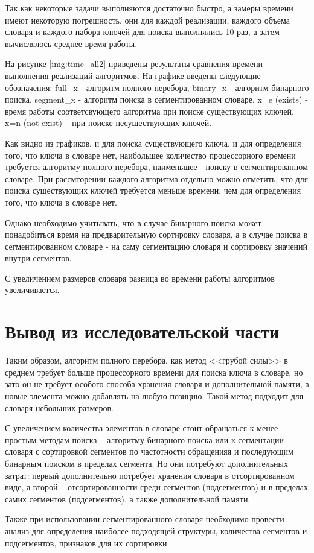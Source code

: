 Так как некоторые задачи выполняются достаточно быстро, а замеры времени имеют некоторую погрешность, они для каждой реализации, каждого объема словаря и каждого набора ключей для поиска выполнялись 10 раз, а затем вычислялось среднее время работы.
 

На рисунке \ref{img:time_all2} приведены результаты сравнения времени выполнения реализаций алгоритмов. На графике введены следующие обозначения: full\_x - алгоритм полного перебора, binary\_x - алгоритм бинарного поиска, segment\_x - алгоритм поиска в сегментированном словаре, x=e (exists) - время работы соответсвующего алгоритма при поиске существующих ключей, x=n (not exist) -- при поиске несуществующих ключей.

\clearpage
{}

Как видно из графиков, и для поиска существующего ключа, и для определения того, что ключа в словаре нет, наибольшее количество процессорного времени требуется алгоритму полного перебора, наименьшее - поиску в сегментированном словаре. При рассмторении каждого алгоритма отдельно можно отметить, что для поиска существующих ключей требуется меньше времени, чем для определения того, что ключа в словаре нет.

Однако необходимо учитывать, что в случае бинарного поиска может понадобиться время на предварительную сортировку словаря, а в случае поиска в сегментированном словаре - на саму сегментацию словаря и сортировку значений внутри сегментов.

С увеличением размеров словаря разница во времени работы алгоритмов увеличивается.






\clearpage
\section{Вывод из исследовательской части}

Таким образом, алгоритм полного перебора, как метод <<грубой силы>> в среднем требует больше процессорного времени для поиска ключа в словаре, но зато он не требует особого способа хранения словаря и дополнительной памяти, а новые элемента можно добавлять на любую позицию. Такой метод подходит для словаря небольших размеров.

С увеличением количества элементов в словаре стоит обращаться к менее простым методам поиска -- алгоритму бинарного поиска или к сегментации словаря с сортировкой сегментов по частотности обращенияя и последующим бинарным поиском в пределах сегмента. Но они потребуют дополнительных затрат: первый дополнительно потребует  хранения словаря в отсортированном виде, а второй -- отсортированности среди сегментов (подсегментов) и в пределах самих сегментов (подсегментов), а также дополнительной памяти.

Также при использовании сегментированного словаря необходимо провести анализ для определения наиболее подходящей структуры, количества сегментов и подсегментов, признаков для их сортировки.